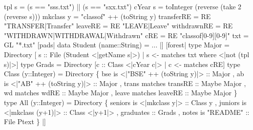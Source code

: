 {
\begin{code}
tpl s = (s == "sss.txt") || (s == "sxx.txt")
cYear s = 
  toInteger (reverse (take 2 (reverse s)))
mkclass y = "classof" ++ (toString y)
\mbox{}
transferRE  = RE "TRANSFER|Transfer"
leaveRE     = RE "LEAVE|Leave"
withdrawnRE = RE "WITHDRAWN|WITHDRAWAL|Withdrawn"
cRE         = RE "classof[0-9][0-9]"
txt         = GL "*.txt"
\mbox{}
[pads|
  data Student (name::String) = ...
|]
\mbox{}
[forest|
  type Major = Directory  
    [ s :: File (Student <|getName s|>) 
    | s <- matches txt where <|not (tpl s)|>]
\mbox{}
  type Grads = Directory 
    [c :: Class <|cYear c|> | c <- matches cRE]
\mbox{}
  type Class (y::Integer) = Directory
    \{ bse is <|"BSE" ++ (toString y)|> :: Major
    , ab  is <|"AB"  ++ (toString y)|> :: Major   
    , trans matches transRE :: Maybe Major      
    , wd matches wdRE :: Maybe Major
    , leave matches leaveRE :: Maybe Major 
    \}
\mbox{}
  type All (y::Integer) = Directory
    \{ seniors is <|mkclass y|> :: Class y
    , juniors is <|mkclass (y+1)|> :: Class <|y+1|>
    , graduates :: Grads
    , notes is "README" :: File Ptext
    \}
|]
\end{code}
}